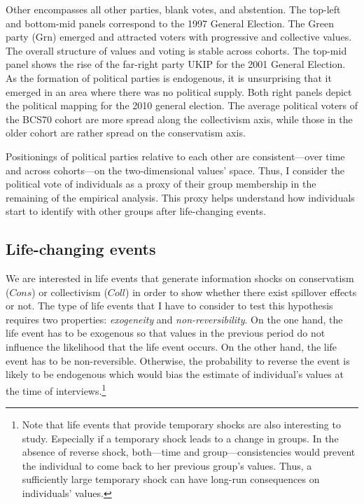 Other encompasses all other parties, blank votes, and abstention.
The top-left and bottom-mid panels correspond to the 1997 General Election. The Green party (Grn) emerged and attracted voters with progressive and collective values. The overall structure of values and voting is stable across cohorts.
The top-mid panel shows the rise of the far-right party UKIP for the 2001 General Election. As the formation of political parties is endogenous, it is unsurprising that it emerged in an area where there was no political supply.
Both right panels depict the political mapping for the 2010 general election. The average political voters of the BCS70 cohort are more spread along the collectivism axis, while those in the older cohort are rather spread on the conservatism axis.

Positionings of political parties relative to each other are consistent---over time and across cohorts---on the two-dimensional values' space. Thus, I consider the political vote of individuals as a proxy of their group membership in the remaining of the empirical analysis. This proxy helps understand how individuals start to identify with other groups after life-changing events.

\subsection{Life-changing events}

We are interested in life events that generate information shocks on conservatism ($Cons$) or collectivism ($Coll$) in order to show whether there exist spillover effects or not. The type of life events that I have to consider to test this hypothesis requires two properties: \textit{exogeneity} and \textit{non-reversibility}.
On the one hand, the life event has to be exogenous so that values in the previous period do not influence the likelihood that the life event occurs. 
On the other hand, the life event has to be non-reversible. Otherwise, the probability to reverse the event is likely to be endogenous which would bias the estimate of individual's values at the time of interviews.\footnote{Note that life events that provide temporary shocks are also interesting to study. Especially if a temporary shock leads to a change in groups. In the absence of reverse shock, both---time and group---consistencies would prevent the individual to come back to her previous group's values. Thus, a sufficiently large temporary shock can have long-run consequences on individuals' values.}

